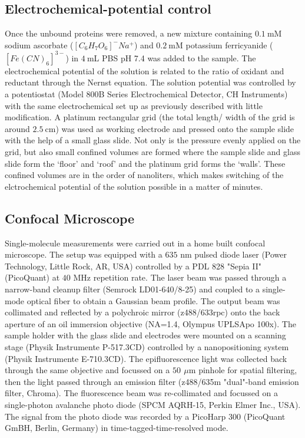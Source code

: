 \documentclass[journal=jacsat,manuscript=article]{achemso}
\newcommand{\um}{\ensuremath{\,\mu\textrm{m}}}
\begin{document}
\subsection{Electrochemical-potential control}
Once the unbound proteins were removed, a new mixture containing $0.1~$mM sodium ascorbate ($[C_6H_7O_6]^-Na^+$) and $0.2~$mM potassium ferricyanide ($[Fe(CN)_6]^{3-}$) in $4~$mL PBS pH 7.4 was added to the sample. The electrochemical potential of the solution is related to the ratio of oxidant and reductant through the Nernst equation. The solution potential was controlled by a potentiostat (Model 800B Series Electrochemical Detector, CH Instruments) with the same electrochemical set up as previously described\cite{zhang2017gold} with little modification. A platinum rectangular grid (the total length/ width of the grid is around $2.5~$cm) was used as working electrode and pressed onto the sample slide with the help of a small glass slide. Not only is the pressure evenly applied on the grid, but also small confined volumes are formed where the sample slide and glass slide form the `floor' and `roof' and the platinum grid forms the `walls'. These confined volumes are in the order of nanoliters, which makes switching of the elctrochemical potential of the solution possible in a matter of minutes.
\subsection{Confocal Microscope}
Single-molecule measurements were carried out in a home built confocal microscope. The setup was equipped with a $635$ nm pulsed diode laser (Power Technology, Little Rock, AR, USA) controlled by a PDL 828 "Sepia II" (PicoQuant) at $40$ MHz repetition rate. The laser beam was passed through a narrow-band cleanup filter (Semrock LD01-640/8-25) and coupled to a single-mode optical fiber to obtain a Gaussian beam profile. The output beam was collimated and reflected by a polychroic mirror (z488/633rpc) onto the back aperture of an oil immersion objective (NA=1.4, Olympus UPLSApo 100x). The sample holder with the glass slide and electrodes were mounted on a scanning stage (Physik Instrumente P-517.3CD) controlled by a nanopositioning system (Physik Instrumente E-710.3CD). The epifluorescence light was collected back through the same objective and focussed on a $50~\um$ pinhole for spatial filtering, then the light passed through an emission filter (z488/635m "dual"-band emission filter, Chroma). The fluorescence beam was re-collimated and focussed on a single-photon avalanche photo diode (SPCM AQRH-15, Perkin Elmer Inc., USA). The signal from the photo diode was recorded by a PicoHarp 300 (PicoQuant GmBH, Berlin, Germany) in time-tagged-time-resolved mode.
\end{document}

